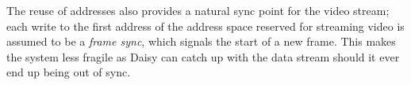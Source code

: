 The reuse of addresses also provides a natural sync point for the video stream;
each write to the first address of the address space reserved for streaming video is assumed to be a \textit{frame sync}, which signals the start of a new frame.
This makes the system less fragile as Daisy can catch up with the data stream should it ever end up being out of sync.

